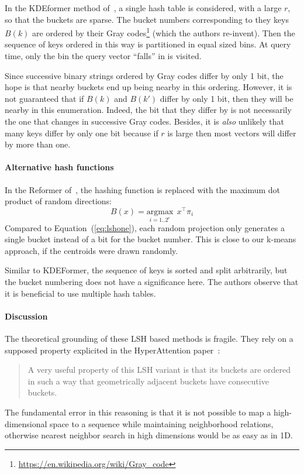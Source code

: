 In the KDEformer method of~\citet{zandieh2023kdeformer},  a single hash table is considered, with a large $r$, so that the buckets are sparse. 
The bucket numbers corresponding to they keys $B(k)$ are ordered by their Gray codes\footnote{\url{https://en.wikipedia.org/wiki/Gray_code}} (which the authors re-invent).
Then the sequence of keys ordered in this way is partitioned in equal sized bins.  
At query time, only the bin the query vector ``falls'' in is visited. 

Since successive binary strings ordered by Gray codes differ by only 1 bit, the hope is that nearby buckets end up being nearby in this ordering.  
However, it is not guaranteed that if $B(k)$ and $B(k')$ differ by only 1 bit, then they will be nearby in this enumeration. 
Indeed, the bit that they differ by is not necessarily the one that changes in successive Gray codes. 
Besides, it is \emph{also} unlikely that many keys differ by only one bit because if $r$ is large then most vectors will differ by more than one. 


\paragraph{Alternative hash functions}

In the Reformer of~\citet{kitaev2020reformer}, the hashing function is replaced with the maximum dot product of random directions:
\begin{equation}
    B(x) = \underset{i=1..2^r}{\mathrm{argmax}}~~ x^\top\pi_i
\end{equation}
Compared to Equation~(\ref{eq:lshone}), each random projection only generates a single bucket instead of a bit for the bucket number.  
This is close to our k-means approach, if the centroids were drawn randomly. 

Similar to KDEFormer, the sequence of keys is sorted and split arbitrarily, but the bucket numbering does not have a significance here. 
The authors observe that it is beneficial to use multiple hash tables. 

\paragraph{Discussion}

The theoretical grounding of these LSH based methods is fragile. 
They rely on a supposed property explicited in the HyperAttention paper~\cite{han2023hyperattention}:
\begin{quote}
 A very
useful property of this LSH variant is that its buckets are ordered in such a way that geometrically
adjacent buckets have consecutive buckets.    
\end{quote}
The fundamental error in this reasoning is that it is not possible to map a high-dimensional space to a sequence while maintaining neighborhood relations, otherwise nearest neighbor search in high dimensions would be as easy as in 1D. 

